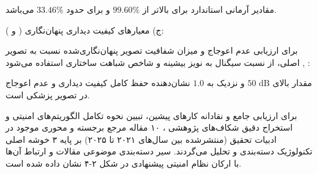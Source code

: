 مقادیر آرمانی استاندارد برای  بالاتر از $99.60\%$ و برای  حدود $33.46\%$ می‌باشد.\par



ج) معیارهای کیفیت دیداری پنهان‌نگاری ( و ):\par

برای ارزیابی عدم اعوجاج و میزان شفافیت تصویر پنهان‌نگاری‌شده نسبت به تصویر اصلی، از نسبت سیگنال به نویز بیشینه  و شاخص شباهت ساختاری  استفاده می‌شود , :\par






مقدار  بالای $50\text{ dB}$ و  نزدیک به $1.0$ نشان‌دهنده حفظ کامل کیفیت دیداری و عدم اعوجاج در تصویر پزشکی است.\par





برای ارزیابی جامع و نقادانه کارهای پیشین، تبیین نحوه تکامل الگوریتم‌های امنیتی و استخراج دقیق شکاف‌های پژوهشی ، ۱۰ مقاله مرجع برجسته و محوری موجود در ادبیات تحقیق (منتشرشده بین سال‌های ۲۰۲۱ تا ۲۰۲۵) بر پایه ۳ خوشه اصلی تکنولوژیک دسته‌بندی و تحلیل می‌گردند. سیر دسته‌بندی موضوعی مقالات و ارتباط آن‌ها با ارکان نظام امنیتی پیشنهادی در شکل ۲{-}۴ نشان داده شده است.\par

